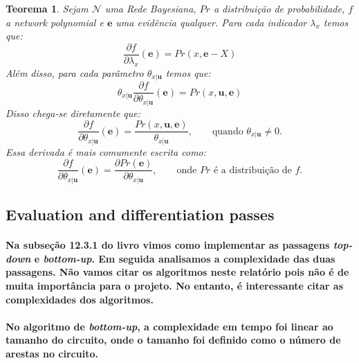 \documentclass[a4paper,10pt]{article}
\theoremstyle{plain}
\newtheorem*{spn-thm}{Teorema}
\begin{document}
\begin{spn-thm} Sejam $\mathcal{N}$ uma Rede Bayesiana, $Pr$ a distribuição de probabilidade, $f$ a
\textit{network polynomial} e $\textbf{e}$ uma evidência qualquer. Para cada indicador $\lambda_x$ 
temos que:
\begin{equation}
\frac{\partial{f}}{\partial{\lambda_x}}(\textbf{e}) = Pr(x, \textbf{e} - X)
\end{equation}
Além disso, para cada parâmetro $\theta_{x|\textbf{u}}$ temos que:
\begin{equation}
\theta_{x|\textbf{u}}\frac{\partial{f}}{\partial{\theta_{x|\textbf{u}}}}(\textbf{e})=Pr(x,\textbf{u},\textbf{e})
\end{equation}
Disso chega-se diretamente que:
\begin{equation}
\frac{\partial{f}}{\partial{\theta_{x|\textbf{u}}}}(\textbf{e})=\frac{Pr(x,\textbf{u},\textbf{e})}{\theta_{x|\textbf{u}}},
\qquad \text{quando $\theta_{x|\textbf{u}} \neq 0$.}
\end{equation}
Essa derivada é mais comumente escrita como:
\begin{equation}
\frac{\partial{f}}{\partial{\theta_{x|\textbf{u}}}}(\textbf{e})=\frac{\partial{Pr(\textbf{e})}}{\partial{\theta_{x|\textbf{u}}}},
\qquad \text{onde $Pr$ é a distribuição de $f$.}
\end{equation}
\end{spn-thm}

\subsection{Evaluation and differentiation passes}

\paragraph{
  Na subseção 12.3.1 do livro vimos como implementar as passagens \textit{top-down} e 
\textit{bottom-up}. Em seguida analisamos a complexidade das duas passagens. Não vamos citar os
algoritmos neste relatório pois não é de muita importância para o projeto. No entanto, é 
interessante citar as complexidades dos algoritmos.
}

\paragraph{
  No algoritmo de \textit{bottom-up}, a complexidade em tempo foi linear ao tamanho do circuito, 
onde o tamanho foi definido como o número de arestas no circuito.
}
\end{document}
